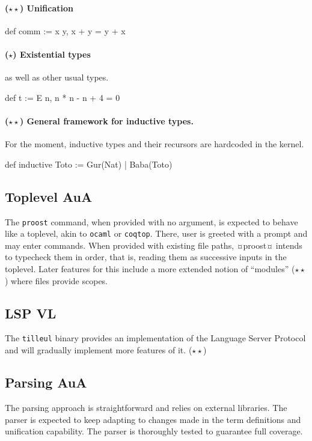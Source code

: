 \documentclass[twocolumn]{article}
\newcommand{\members}[1]{\texorpdfstring{\hfill\scriptsize #1}{}}
\newcommand{\etun}{{\color{Green} ($\star$)} }
\newcommand{\etde}{{\color{Orange} ($\star\star$)} }
\begin{document}
\paragraph{\etde Unification}
\phantom{hello}
\begin{mdln}
def comm := \/x y, x + y = y + x
\end{mdln}

\paragraph{\etun Existential types} as well as other usual types.
\begin{mdln}
def t := E n, n * n - n + 4 = 0
\end{mdln}

\paragraph{\etde General framework for inductive types.} For the moment,
inductive types and their recursors are hardcoded in the kernel.
\begin{mdln}
def inductive Toto :=
  Gur(Nat) | Baba(Toto)
\end{mdln}

\subsection{Toplevel  \members{AuA}}
The \texttt{proost} command, when provided with no argument, is expected to
behave like a toplevel, akin to \texttt{ocaml} or \texttt{coqtop}. There, user
is greeted with a prompt and may enter commands. When provided with existing
file paths, ¤proost¤ intends to typecheck them in order, that is, reading them
as successive inputs in the toplevel. Later features for this include a more
extended notion of ``modules'' \etde where files provide scopes.
\begin{center}
\end{center}


\subsection{LSP \members{VL}}
The \texttt{tilleul} binary provides an implementation of the Language Server
Protocol and will gradually implement more features of it. \etde

\subsection{Parsing \members{AuA}}
The parsing approach is straightforward and
relies on external libraries. The parser is expected to keep adapting to changes
made in the term definitions and unification capability. The parser is
thoroughly tested to guarantee full coverage.
\end{document}
